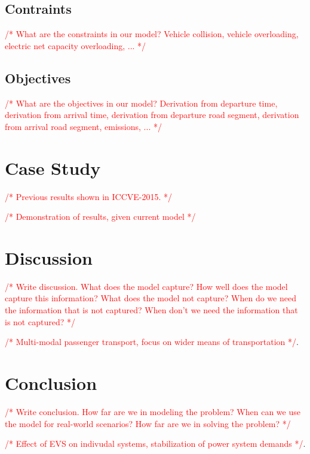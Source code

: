 \documentclass[conference]{IEEEtran}
\newcommand{\todo}[1]{\textcolor{red}{/* #1 */}}
\begin{document}
	\subsection{Contraints}
	
	\todo{What are the constraints in our model? Vehicle collision, vehicle overloading, electric net capacity overloading, ...}
	
	\subsection{Objectives}
	
	\todo{What are the objectives in our model? Derivation from departure time, derivation from arrival time, derivation from departure road segment, derivation from arrival road segment, emissions, ...}
	
	\section{Case Study}
	\label{case}
	
	\todo{Previous results shown in ICCVE-2015.}
	
	\todo{Demonstration of results, given current model}
	
	\section{Discussion}
	\label{discussion}
	
	\todo{Write discussion. What does the model capture? How well does the model capture this information? What does the model not capture? When do we need the information that is not captured? When don't we need the information that is not captured?}
	
	\todo{Multi-modal passenger transport, focus on wider means of transportation}.
		
	
	\section{Conclusion}
	\label{conclusion}
	
	\todo{Write conclusion. How far are we in modeling the problem? When can we use the model for real-world scenarios? How far are we in solving the problem?}
	
	\todo{Effect of EVS on indivudal systems, stabilization of power system demands}.
		
	
	
	
	
\end{document}
